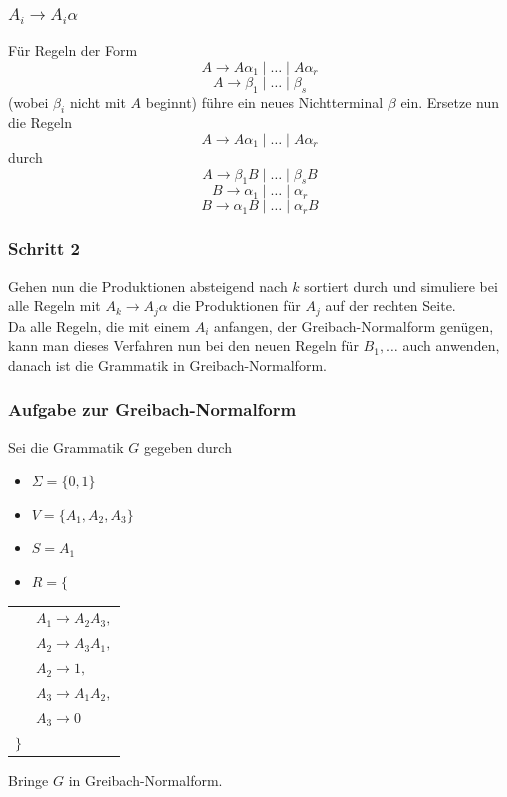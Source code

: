 \begin{frame}
\frametitle{$A_i \rightarrow A_i\alpha$}
Für Regeln der Form 
$$A \rightarrow A\alpha_1 \mid \ldots \mid A\alpha_r$$
$$A \rightarrow \beta_1 \mid \ldots \mid \beta_s$$
(wobei $\beta_i$ nicht mit $A$ beginnt) führe ein neues Nichtterminal $\beta$ ein. Ersetze nun die Regeln
$$A \rightarrow A\alpha_1 \mid \ldots \mid A\alpha_r$$
durch
$$A \rightarrow \beta_1B \mid \ldots \mid \beta_sB$$
$$B \rightarrow \alpha_1 \mid \ldots \mid \alpha_r$$
$$B \rightarrow \alpha_1B \mid \ldots \mid \alpha_rB$$
\end{frame}

\begin{frame}
 \frametitle{Schritt 2}
Gehen nun die Produktionen absteigend nach $k$ sortiert durch und simuliere bei alle Regeln mit $A_k \rightarrow A_j\alpha$ die Produktionen für $A_j$ auf der rechten Seite.\\
Da alle Regeln, die mit einem $A_i$ anfangen, der Greibach-Normalform genügen, kann man dieses Verfahren nun bei den neuen Regeln für $B_1,\ldots$ auch anwenden, danach ist die Grammatik in Greibach-Normalform.
\end{frame}

\begin{frame}
\frametitle{Aufgabe zur Greibach-Normalform}
Sei die Grammatik $G$ gegeben durch
\begin{itemize}
 \item $\Sigma = \{0, 1\}$
 \item $V = \{A_1, A_2, A_3\}$
 \item $S = A_1$
 \item $R = \{$
\end{itemize}

\begin{tabular}{ll}
 	 & $A_1 \rightarrow A_2A_3,$ \\
 	& $A_2 \rightarrow A_3A_1,$ \\
 	&	$A_2 \rightarrow 1,$ \\
 	&	$A_3 \rightarrow A_1A_2,$ \\
 	& $A_3 \rightarrow 0$ \\
 	$ \}$ &
 	\end{tabular}
 	
\ducttape{1cm}

Bringe $G$ in Greibach-Normalform.
\end{frame}

